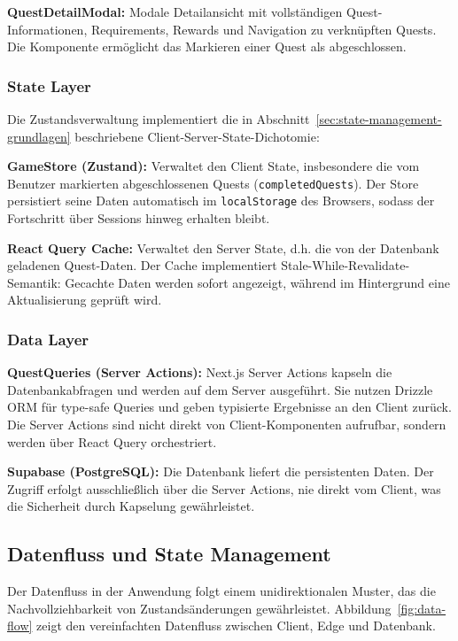 \textbf{QuestDetailModal:} Modale Detailansicht mit vollständigen Quest-Informationen, Requirements, Rewards und Navigation zu verknüpften Quests. Die Komponente ermöglicht das Markieren einer Quest als abgeschlossen.

\subsubsection{State Layer}

Die Zustandsverwaltung implementiert die in Abschnitt~\ref{sec:state-management-grundlagen} beschriebene Client-Server-State-Dichotomie:

\textbf{GameStore (Zustand):} Verwaltet den Client State, insbesondere die vom Benutzer markierten abgeschlossenen Quests (\texttt{completedQuests}). Der Store persistiert seine Daten automatisch im \texttt{localStorage} des Browsers, sodass der Fortschritt über Sessions hinweg erhalten bleibt.

\textbf{React Query Cache:} Verwaltet den Server State, d.h. die von der Datenbank geladenen Quest-Daten. Der Cache implementiert Stale-While-Revalidate-Semantik: Gecachte Daten werden sofort angezeigt, während im Hintergrund eine Aktualisierung geprüft wird.

\subsubsection{Data Layer}

\textbf{QuestQueries (Server Actions):} Next.js Server Actions kapseln die Datenbankabfragen und werden auf dem Server ausgeführt. Sie nutzen Drizzle \ac{ORM} für type-safe Queries und geben typisierte Ergebnisse an den Client zurück. Die Server Actions sind nicht direkt von Client-Komponenten aufrufbar, sondern werden über React Query orchestriert.

\textbf{Supabase (PostgreSQL):} Die Datenbank liefert die persistenten Daten. Der Zugriff erfolgt ausschließlich über die Server Actions, nie direkt vom Client, was die Sicherheit durch Kapselung gewährleistet.

\subsection{Datenfluss und State Management}
\label{sec:datenfluss}

Der Datenfluss in der Anwendung folgt einem unidirektionalen Muster, das die Nachvollziehbarkeit von Zustandsänderungen gewährleistet. Abbildung~\ref{fig:data-flow} zeigt den vereinfachten Datenfluss zwischen Client, Edge und Datenbank.

